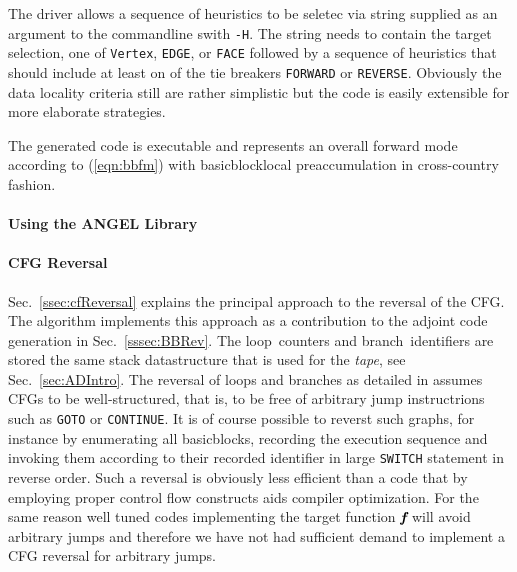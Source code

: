 \documentclass[11pt]{article}
\newcommand{\Loop}{loop}
\newcommand{\branch}{branch}
\newcommand{\basicblock}{basicblock}
\newcommand{\bmf}{\mbox{\bf\em f}}
\newcommand{\code}[1]{{\small\tt{#1}}}
\newcommand{\refsec}[1]{{Sec.~\ref{#1}}}
\newcommand{\refeqn}[1]{{(\ref{#1})}}
\begin{document}
The driver allows a sequence of heuristics to be seletec via string supplied as 
an argument to the commandline swith \code{-H}. The string needs to contain 
the target selection, one of \code{Vertex}, \code{EDGE}, or \code{FACE} followed by 
a sequence of heuristics that should include at least on of the tie breakers \code{FORWARD} or 
\code{REVERSE}. 
Obviously the data locality criteria still are rather simplistic but 
the code is easily extensible for more elaborate strategies. 

The generated code is executable and represents an overall forward mode 
according to \refeqn{eqn:bbfm} with \basicblock\-local preaccumulation in 
cross-country fashion. 

\paragraph{Using the ANGEL Library}\label{sssec:angel}
\paragraph{CFG Reversal}\label{sssec:cfgRevAlg}

\refsec{ssec:cfReversal} explains the principal approach to the reversal 
of the CFG. The algorithm implements this approach as a contribution to the 
adjoint code generation in \refsec{sssec:BBRev}. 
The \Loop\ counters and \branch\ identifiers are stored the same 
stack datastructure that is used for the {\em tape}, see \refsec{sec:ADIntro}.  
The reversal of loops and branches as detailed in \cite{NULF04CFR} assumes 
CFGs to be well-structured, that is, to be free of arbitrary jump instructrions 
such as \code{GOTO} or \code{CONTINUE}. 
It is of course possible to reverst such graphs, for instance by enumerating
all {\basicblock}s, recording the execution sequence and invoking them according 
to their recorded identifier in  large  \code {SWITCH} statement in reverse order.
Such a reversal is obviously less efficient than a code that by employing proper 
control flow constructs aids compiler optimization. 
For the same reason well tuned codes implementing the target function $\bmf$ will 
avoid arbitrary jumps and therefore we have not had sufficient demand to implement 
a CFG reversal for arbitrary jumps. 
\end{document}
